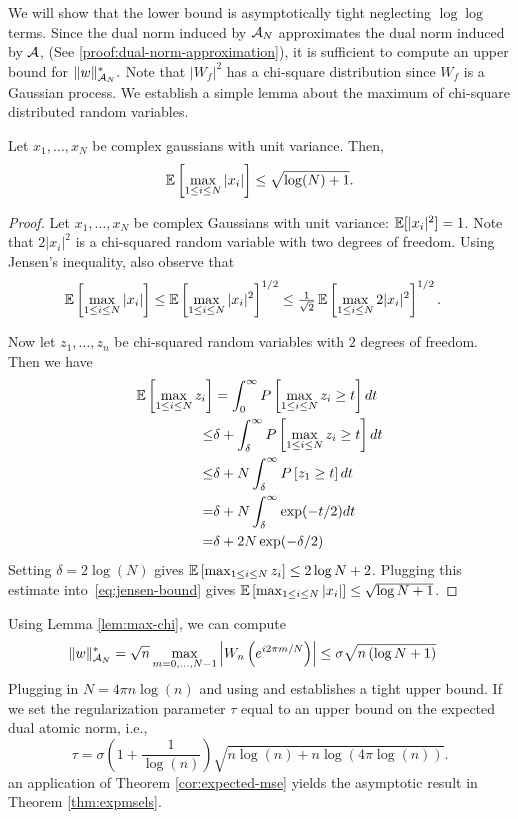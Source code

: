  We will show that the lower bound is asymptotically tight neglecting $\log\log$ terms. Since the dual norm induced by  $\mathcal{A}_N$ approximates the dual norm induced by $\mathcal{A}$, (See \ref{proof:dual-norm-approximation}), it is sufficient to compute an upper bound for $\lVert w\rVert_{\mathcal{A}_N}^*.$ Note that $|W_f|^2$ has a chi-square distribution since $W_f$ is a Gaussian process. We establish a simple lemma about the maximum of chi-square distributed random variables.
\begin{lemma}
\label{lem:max-chi}
Let $x_1,\ldots,x_N$ be complex gaussians with unit variance. Then,
\begin{equation*}
\operatorname{\mathbb{E}}\left[\max_{1\leq i\leq N} |x_i|\right] \leq \sqrt{\log(N) + 1}.
\end{equation*}
\begin{proof}
Let $x_1,\ldots,x_N$ be complex Gaussians with unit variance: $\operatorname{\mathbb{E}}[ |x_i|^2]=1$.  Note that $2|x_i|^2$ is a chi-squared random variable with two degrees of freedom.   Using Jensen's inequality, also observe that
\begin{align}\label{eq:jensen-bound}
	\operatorname{\mathbb{E}}\left[\max_{1\leq i\leq N} |x_i|\right] & \leq  
	\operatorname{\mathbb{E}}\left[\max_{1\leq i\leq N} |x_i|^2\right]^{1/2} \leq  
	\tfrac{1}{\sqrt{2}}\operatorname{\mathbb{E}}\left[\max_{1\leq i\leq N} 2|x_i|^2\right]^{1/2}.
\end{align}

Now let $z_1,\ldots, z_n$ be chi-squared random variables with $2$ degrees of freedom.  Then we have
\begin{align*}
	\operatorname{\mathbb{E}}\left[\max_{1\leq i\leq N} z_i\right] &= \int_0^\infty P\left[ \max_{1\leq i\leq N} z_i \geq t \right] dt\\
	\leq & \delta + \int_\delta^\infty P\left[ \max_{1\leq i\leq N} z_i \geq t \right] dt\\
	\leq & \delta +  N \int_\delta^\infty P\left[  z_1 \geq t\right] dt\\
	= & \delta +  N \int_\delta^\infty   \exp(-t/2) dt\\
	= & \delta +  2N  \exp(-\delta/2)
\end{align*}
Setting $\delta = 2\log(N)$ gives $\operatorname{\mathbb{E}}\left[\max_{1\leq i\leq N} z_i\right] \leq 2 \log{N} + 2$.  Plugging this estimate into~\eqref{eq:jensen-bound} gives $\operatorname{\mathbb{E}}\left[\max_{1\leq i\leq N} |x_i|\right] \leq  \sqrt{\log{N}+1}$.
\end{proof}
\end{lemma}
Using Lemma \ref{lem:max-chi}, we can compute
\begin{align*}
\lVert w\rVert_{\mathcal{A}_N}^* & = \sqrt{n}\max_{m=0,\ldots,N-1} \left| W_n\left(e^{i 2 \pi m/N}\right) \right|  \leq \sigma\sqrt{n\left(\log{N}+1\right)}
\end{align*}
Plugging in $N = 4\pi n \log(n)$ and using  and
 establishes a tight upper bound. If we set the regularization
parameter $\tau$ equal to an upper bound on the expected dual atomic norm, i.e.,
\begin{equation}
\label{eq:tau}
\tau = \sigma\left(1  +  \frac{1}{\log(n)}\right)\sqrt{n \log(n) + n\log(4\pi\log(n))}.
\end{equation}
an application of Theorem \ref{cor:expected-mse} yields the asymptotic result
in Theorem \ref{thm:expmsels}.


